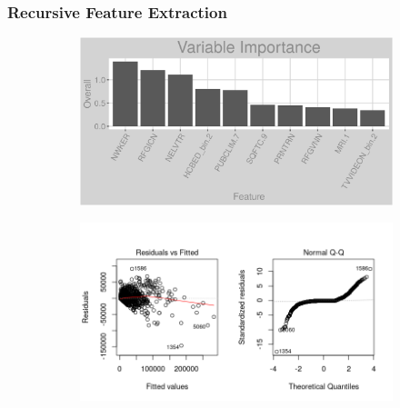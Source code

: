 \subsubsection{Recursive Feature Extraction}
\label{appendix:electricity:rfe}
\begin{figure}[h]
\centering
\begin{subfigure}{1\textwidth}
\centering
\includegraphics[width=.99\textwidth, height=0.3\textheight]{Images/electricity_rfe_vars.png}
\end{subfigure}
\begin{subfigure}{1\textwidth}
\centering
\includegraphics[width=.99\textwidth, height=0.475\textheight]{Images/electricity_rfe_res_1.png}
\end{subfigure}
\end{figure}
\FloatBarrier
\newpage
